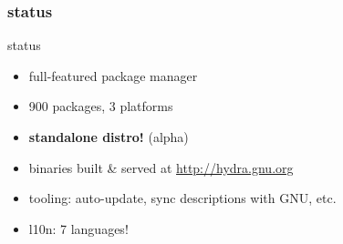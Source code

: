 \documentclass{beamer}
\begin{document}
\begin{frame}[plain]
  \frametitle{status}
\end{frame}

\begin{frame}{status}
  \large{
  \begin{itemize}
    \item full-featured package manager
    \item 900 packages, 3 platforms
    \item \textbf{standalone distro!} (alpha)
    \item binaries built \& served at \url{http://hydra.gnu.org}
    \item tooling: auto-update, sync descriptions with GNU, etc.
    \item l10n: 7 languages!
  \end{itemize}}
\end{frame}
\end{document}
